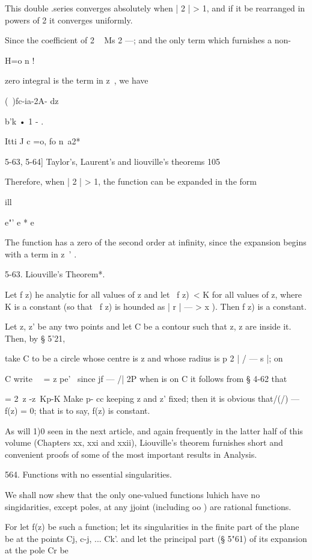 {{{{This double .series converges absolutely when | 2 | > 1, and if it be
rearranged in powers of 2 it converges uniformly.

Since the coefficient of 2 ~ Ms 2 —; and the only term which
furnishes a non-

H=o n !

zero integral is the term in z~, we have

(\ )fc-ia-2A- dz

b'k • 1 - .

Itti J c =o, fo n\ a2*

5-63, 5-64] Taylor's, Laurent's and liouville's theorems 105

Therefore, when | 2 | > 1, the function can be expanded in the form

ill

e"' e * e

The function has a zero of the second order at infinity, since the
expansion begins with a term in z~' .

5-63. Liouville's Theorem*.

Let f z) he analytic for all values of z and let \ f z)\ < K for all
values of z, where K is a constant (so that \ f z) is hounded as | r |
— > x ). Then f z) is a constant.

Let z, z' be any two points and let C be a contour such that z, z are
inside it. Then, by § 5'21,

take C to be a circle whose centre is z and whose radius is p 2 | / —
s |; on

C write \ \ = z pe' \ since jf — /| 2P when is on C it follows from §
4-62 that

= 2\ z -z\ Kp-K Make p- cc keeping z and z' fixed; then it is obvious
that/(/) —f(z) = 0; that is to say, f(z) is constant.

As will 1)0 seen in the next article, and again frequently in the
latter half of this volume (Chapters xx, xxi and xxii), Liouville's
theorem furnishes short and convenient proofs of some of the most
important results in Analysis.

564. Functions with no essential singularities.

We shall now shew that the only one-valued functions luhich have no
singidarities, except poles, at any jjoint (including oo ) are
rational functions.

For let f(z) be such a function; let its singularities in the finite
part of the plane be at the points Cj, c-j, ... Ck'. and let the
principal part (§ 5"61) of its expansion at the pole Cr be

}}}}

